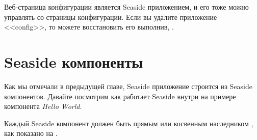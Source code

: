\documentclass[a4paper,10pt,twoside]{book}
\begin{document}

Веб-страница конфигурации является Seaside приложением, и его тоже можно управлять со страницы конфигурации.
Если вы удалите приложение <<config>>, то можете восстановить его выполнив,  .


\section{Seaside компоненты}



Как мы отмечали в предыдущей главе, Seaside приложение строится из
Seaside  компонентов. Давайте посмотрим как работает Seaside внутри на
примере компонента \emph{Hello World}.


Каждый Seaside компонент должен быть прямым или косвенным наследником ,
как показано на .



\end{document}
